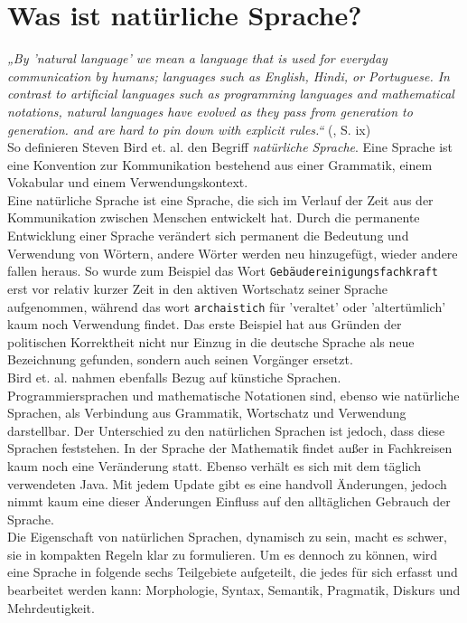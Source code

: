 \documentclass[12pt,twoside]{article}
\theoremstyle{plain}
\theoremstyle{definition}
\theoremstyle{remark}
\begin{document}
\section{Was ist natürliche Sprache?}
\label{sec:def_lang}
\textit{„By 'natural language' we mean a language that is used for everyday communication by humans; languages such as English, Hindi, or Portuguese.
        In contrast to artificial languages such as programming languages and mathematical notations, natural languages have evolved as they pass from generation to generation.
        and are hard to pin down with explicit rules.“} (\cite{Bird2009}, S. ix)\\
So definieren Steven Bird et. al. den Begriff \textit{natürliche Sprache}.
Eine Sprache ist eine Konvention zur Kommunikation bestehend aus einer Grammatik, einem Vokabular und einem Verwendungskontext. \\
Eine natürliche Sprache ist eine Sprache, die sich im Verlauf der Zeit aus der Kommunikation zwischen Menschen entwickelt hat.
Durch die permanente Entwicklung einer Sprache verändert sich permanent die Bedeutung und Verwendung von Wörtern, andere Wörter werden neu hinzugefügt, wieder andere fallen heraus.
So wurde zum Beispiel das Wort \texttt{Gebäudereinigungsfachkraft} erst vor relativ kurzer Zeit in den aktiven Wortschatz seiner Sprache aufgenommen, während das wort \texttt{archaistich} für 'veraltet' oder 'altertümlich' kaum noch Verwendung findet.
Das erste Beispiel hat aus Gründen der politischen Korrektheit nicht nur Einzug in die deutsche Sprache als neue Bezeichnung gefunden, sondern auch seinen Vorgänger ersetzt.\\
Bird et. al. nahmen ebenfalls Bezug auf künstiche Sprachen.
Programmiersprachen und mathematische Notationen sind, ebenso wie natürliche Sprachen, als Verbindung aus Grammatik, Wortschatz und Verwendung darstellbar.
Der Unterschied zu den natürlichen Sprachen ist jedoch, dass diese Sprachen feststehen.
In der Sprache der Mathematik findet außer in Fachkreisen kaum noch eine Veränderung statt.
Ebenso verhält es sich mit dem täglich verwendeten Java.
Mit jedem Update gibt es eine handvoll Änderungen, jedoch nimmt kaum eine dieser Änderungen Einfluss auf den alltäglichen Gebrauch der Sprache.\\
Die Eigenschaft von natürlichen Sprachen, dynamisch zu sein, macht es schwer, sie in kompakten Regeln klar zu formulieren.
Um es dennoch zu können, wird eine Sprache in folgende sechs Teilgebiete aufgeteilt, die jedes für sich erfasst und bearbeitet werden kann:
Morphologie, Syntax, Semantik, Pragmatik, Diskurs und Mehrdeutigkeit.\\
\end{document}
